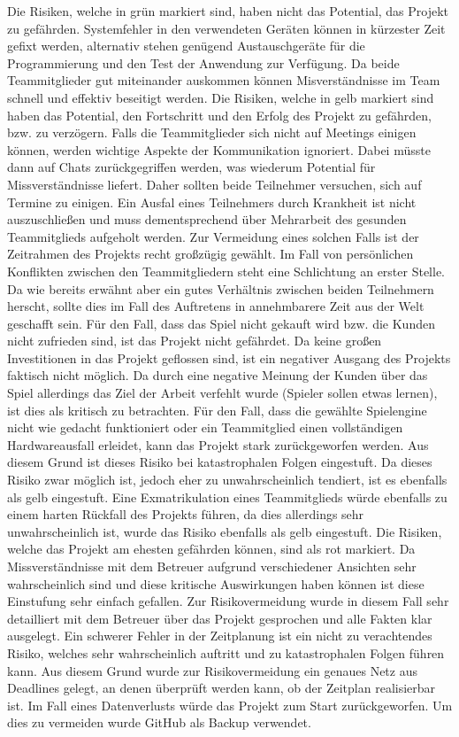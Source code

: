 Die Risiken, welche in grün markiert sind, haben nicht das Potential, das Projekt zu gefährden. Systemfehler in den verwendeten Geräten können in kürzester Zeit gefixt werden, alternativ stehen genügend Austauschgeräte für die Programmierung und den Test der Anwendung zur Verfügung. Da beide Teammitglieder gut miteinander auskommen können Misverständnisse im Team schnell und effektiv beseitigt werden.
Die Risiken, welche in gelb markiert sind haben das Potential, den Fortschritt und den Erfolg des Projekt zu gefährden, bzw. zu verzögern. Falls die Teammitglieder sich nicht auf Meetings einigen können, werden wichtige Aspekte der Kommunikation ignoriert. Dabei müsste dann auf Chats zurückgegriffen werden, was wiederum Potential für Missverständnisse liefert. Daher sollten beide Teilnehmer versuchen, sich auf Termine zu einigen.
Ein Ausfal eines Teilnehmers durch Krankheit ist nicht auszuschließen und muss dementsprechend über Mehrarbeit des gesunden Teammitglieds aufgeholt werden. Zur Vermeidung eines solchen Falls ist der Zeitrahmen des Projekts recht großzügig gewählt. Im Fall von persönlichen Konflikten zwischen den Teammitgliedern steht eine Schlichtung an erster Stelle. Da wie bereits erwähnt aber ein gutes Verhältnis zwischen beiden Teilnehmern herscht, sollte dies im Fall des Auftretens in annehmbarere Zeit aus der Welt geschafft sein. Für den Fall, dass das Spiel nicht gekauft wird bzw. die Kunden nicht zufrieden sind, ist das Projekt nicht gefährdet. Da keine großen Investitionen in das Projekt geflossen sind, ist ein negativer Ausgang des Projekts faktisch nicht möglich. Da durch eine negative Meinung der Kunden über das Spiel allerdings das Ziel der Arbeit verfehlt wurde (Spieler sollen etwas lernen), ist dies als kritisch zu betrachten.
Für den Fall, dass die gewählte Spielengine nicht wie gedacht funktioniert oder ein Teammitglied einen vollständigen Hardwareausfall erleidet, kann das Projekt stark zurückgeworfen werden. Aus diesem Grund ist dieses Risiko bei katastrophalen Folgen eingestuft. Da dieses Risiko zwar möglich ist, jedoch eher zu unwahrscheinlich tendiert, ist es ebenfalls als gelb eingestuft.
Eine Exmatrikulation eines Teammitglieds würde ebenfalls zu einem harten Rückfall des Projekts führen, da dies allerdings sehr unwahrscheinlich ist, wurde das Risiko ebenfalls als gelb eingestuft.
Die Risiken, welche das Projekt am ehesten gefährden können, sind als rot markiert. Da Missverständnisse mit dem Betreuer aufgrund verschiedener Ansichten sehr wahrscheinlich sind und diese kritische Auswirkungen haben können ist diese Einstufung sehr einfach gefallen. Zur Risikovermeidung wurde in diesem Fall sehr detailliert mit dem Betreuer über das Projekt gesprochen und alle Fakten klar ausgelegt.
Ein schwerer Fehler in der Zeitplanung ist ein nicht zu verachtendes Risiko, welches sehr wahrscheinlich auftritt und zu katastrophalen Folgen führen kann. Aus diesem Grund wurde zur Risikovermeidung ein genaues Netz aus Deadlines gelegt, an denen überprüft werden kann, ob der Zeitplan realisierbar ist. Im Fall eines Datenverlusts würde das Projekt zum Start zurückgeworfen. Um dies zu vermeiden wurde GitHub als Backup verwendet.
\pagebreak
